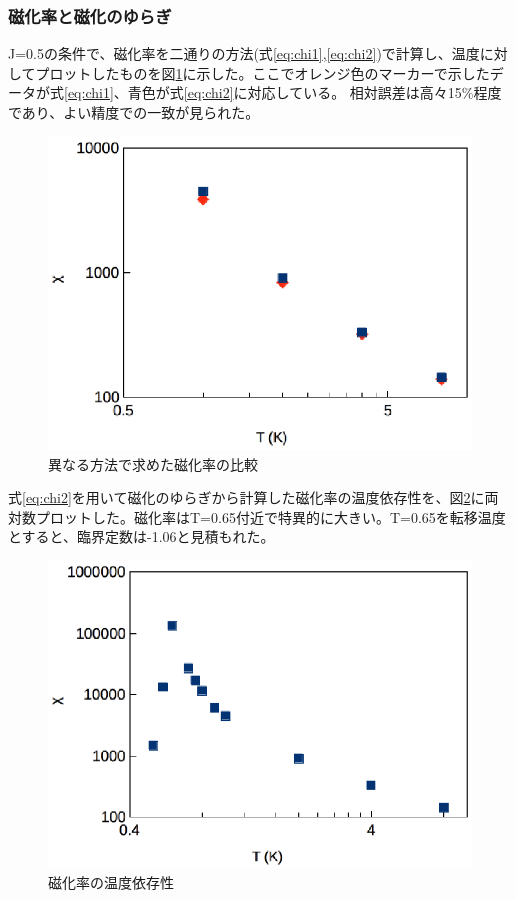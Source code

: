 \documentclass[11pt,a4]{jarticle}
\begin{document}
\subsubsection{磁化率と磁化のゆらぎ}
J=0.5の条件で、磁化率を二通りの方法(式\ref{eq:chi1},\ref{eq:chi2})で計算し、温度に対してプロットしたものを図\ref{fig:comparison_chi}に示した。ここでオレンジ色のマーカーで示したデータが式\ref{eq:chi1}、青色が式\ref{eq:chi2}に対応している。
相対誤差は高々15$\%$程度であり、よい精度での一致が見られた。
\begin{figure}[htbp]
  \begin{center}
   \includegraphics[width=0.75\hsize]{comparison_chi.eps}
  \end{center}
  \caption{異なる方法で求めた磁化率の比較}
  \label{fig:comparison_chi}
\end{figure}

式\ref{eq:chi2}を用いて磁化のゆらぎから計算した磁化率の温度依存性を、図\ref{fig:temperature_dependence_chi}に両対数プロットした。磁化率はT=0.65付近で特異的に大きい。T=0.65を転移温度とすると、臨界定数は-1.06と見積もれた。
\begin{figure}[htbp]
  \begin{center}
   \includegraphics[width=0.75\hsize]{temperature_dependence_chi.eps}
  \end{center}
  \caption{磁化率の温度依存性}
  \label{fig:temperature_dependence_chi}
\end{figure}
\end{document}
